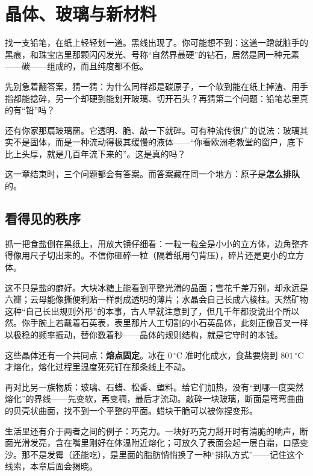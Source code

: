 \chapter{晶体、玻璃与新材料}

\begin{kaichang}
找一支铅笔，在纸上轻轻划一道。黑线出现了。你可能想不到：这道一蹭就脏手的黑痕，和珠宝店里那颗闪闪发光、号称“自然界最硬”的钻石，居然是同一种元素——碳——组成的，而且纯度都不低。

先别急着翻答案，猜一猜：为什么同样都是碳原子，一个软到能在纸上掉渣、用手指都能捻碎，另一个却硬到能划开玻璃、切开石头？再猜第二个问题：铅笔芯里真的有“铅”吗？

还有你家那扇玻璃窗。它透明、脆、敲一下就碎。可有种流传很广的说法：玻璃其实不是固体，而是一种流动得极其缓慢的液体——“你看欧洲老教堂的窗户，底下比上头厚，就是几百年流下来的”。这是真的吗？

这一章结束时，三个问题都会有答案。而答案藏在同一个地方：原子是\textbf{怎么排队}的。
\end{kaichang}

\section{看得见的秩序}

抓一把食盐倒在黑纸上，用放大镜仔细看：一粒一粒全是小小的立方体，边角整齐得像用尺子切出来的。不信你砸碎一粒（隔着纸用勺背压），碎片还是更小的立方体。

这不只是盐的癖好。大块冰糖上能看到平整光滑的晶面；雪花千差万别，却永远是六瓣；云母能像撕便利贴一样剥成透明的薄片；水晶会自己长成六棱柱。天然矿物这种“自己长出规则外形”的本事，古人早就注意到了，但几千年都没说出个所以然。你手腕上若戴着石英表，表里那片人工切割的小石英晶体，此刻正像音叉一样以极稳的频率振动，替你数着秒——晶体的规则结构，就是它守时的本钱。

这些晶体还有一个共同点：\textbf{熔点固定}。冰在 $0\,^{\circ}\mathrm{C}$ 准时化成水，食盐要烧到 $801\,^{\circ}\mathrm{C}$ 才熔化，熔化过程里温度死死钉在那条线上不动。

再对比另一族物质：玻璃、石蜡、松香、塑料。给它们加热，没有“到哪一度突然熔化”的界线——先变软，再变稠，最后才流动。敲碎一块玻璃，断面是弯弯曲曲的贝壳状曲面，找不到一个平整的平面。蜡块干脆可以被你捏变形。

生活里还有介于两者之间的例子：巧克力。一块好巧克力掰开时有清脆的响声，断面光滑发亮，含在嘴里刚好在体温附近熔化；可放久了表面会起一层白霜，口感变沙。那不是发霉（还能吃），是里面的脂肪悄悄换了一种“排队方式”——记住这个线索，本章后面会揭晓。

